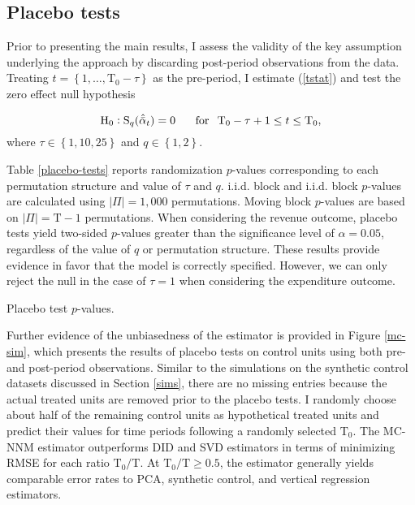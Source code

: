 \subsection{Placebo tests}

Prior to presenting the main results, I assess the validity of the key assumption underlying the approach by discarding post-period observations from the data. Treating $t = \left\{1, \ldots,  \text{T}_0 - \tau\right\}$ as the pre-period, I estimate (\ref{tstat}) and test the zero effect null hypothesis 

\begin{equation} \label{h0-placebo}
\text{H}_0: \text{S}_q (\hat{\bar{\alpha}}_{t}) = 0  \, \hspace{5mm} \,  \text{for} \, \hspace{2mm}  \text{T}_0 - \tau +1 \leq t \leq  \text{T}_0,
\end{equation}
\noindent
where $\tau \in \left\{1, 10, 25\right\}$ and $q \in \left\{1, 2\right\}$. 

Table \ref{placebo-tests} reports randomization $p$-values corresponding to each permutation structure and value of $\tau$ and $q$. i.i.d. block and i.i.d. block $p$-values are calculated using $|\Pi| = 1,000$ permutations. Moving block $p$-values are based on $|\Pi| = \text{T}-1$ permutations. When considering the revenue outcome, placebo tests yield two-sided $p$-values greater than the significance level of $\alpha = 0.05$, regardless of the value of $q$ or permutation structure. These results provide evidence in favor that the model is correctly specified. However, we can only reject the null in the case of $\tau=1$ when considering the expenditure outcome. 

\begin{table}[htbp]
	\captionsetup{font=normalsize}
	\caption{Placebo test $p$-values.\label{placebo-tests}}
	\begin{center}
		\scalebox{.9}{}
	\end{center}
\end{table}

Further evidence of the unbiasedness of the estimator is provided in Figure \ref{mc-sim}, which presents the results of placebo tests on control units using both pre- and post-period observations. Similar to the simulations on the synthetic control datasets discussed in Section \ref{sims}, there are no missing entries because the actual treated units are removed prior to the placebo tests. I randomly choose about half of the remaining control units as hypothetical treated units and predict their values for time periods following a randomly selected $\text{T}_0$. The MC-NNM estimator outperforms DID and SVD estimators in terms of minimizing RMSE for each ratio $\text{T}_0/\text{T}$. At $\text{T}_0/\text{T} \geq 0.5$, the estimator generally yields comparable error rates to PCA, synthetic control, and vertical regression estimators. 

